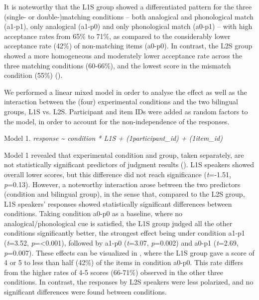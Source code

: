 \documentclass[output=paper]{langscibook}
\begin{document}
{It is noteworthy that the L1S group showed a differentiated pattern for the three (single- or double-)matching conditions – both analogical and} {phonological match (a1-p1), only analogical (a1-p0) and only phonological match (a0-p1) – with high acceptance rates from 65\% to 71\%, as compared to the considerably lower acceptance rate (42\%) of non-matching items (a0-p0). In contrast, the L2S group showed a more homogeneous and moderately lower acceptance rate across the three matching conditions (60-66\%), and the lowest score in the mismatch condition (55\%) ().}

{We performed a linear mixed model} {\citep{BatesEtAl2015}} {in order to analyse the effect as well as the interaction between the (four) experimental conditions and the two bilingual groups, L1S vs. L2S. Participant and item IDs were added as random factors to the model, in order to account for the non-independence of the responses.}

Model 1. \textit{response {\textasciitilde} condition * L1S + (1{\textbar}participant\_id) + (1{\textbar}item\_id)}

Model 1 revealed that experimental condition and group, taken separately, are not statistically significant predictors of judgment results (). L1S speakers showed overall lower scores, but this difference did not reach significance (\textit{t}=-1.51, \textit{p}=0.13). However, a noteworthy interaction arose between the two predictors (condition and bilingual group), in the sense that, compared to the L2S group, L1S speakers’ responses showed statistically significant differences between conditions. Taking condition a0-p0 as a baseline, where no analogical/phonological cue is satisfied, the L1S group judged all the other conditions significantly better, the strongest effect being under condition a1-p1 (\textit{t}=3.52, \textit{p}=<0.001), followed by a1-p0 (\textit{t}=3.07, \textit{p}=0.002) and a0-p1 (\textit{t}=2.69, \textit{p}=0.007). These effects can be visualized in , where the L1S group gave a score of 4 or 5 to less than half (42\%) of the items in condition a0-p0. This rate differs from the higher rates of 4-5 scores (66-71\%) observed in the other three conditions. In contrast, the responses by L2S speakers were less polarized, and no significant differences were found between conditions.
\end{document}
